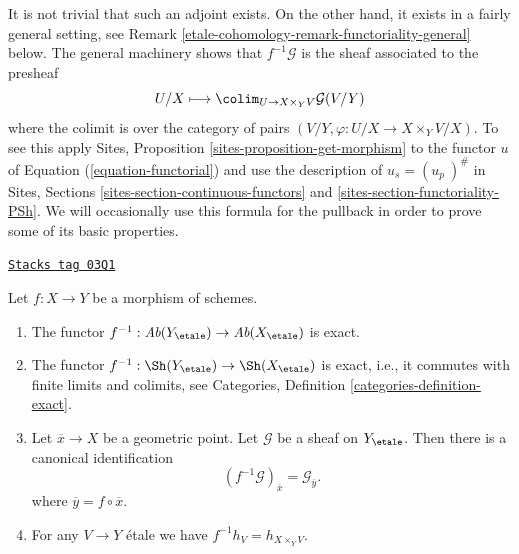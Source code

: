 It is not trivial that such an adjoint exists.
On the other hand, it exists in a fairly general setting, see
Remark \ref{etale-cohomology-remark-functoriality-general}
below. The general machinery shows that $f^{-1}\mathcal{G}$
is the sheaf associated to the presheaf
\begin{equation}
\label{equation-pullback}
U/X
\longmapsto
\colim_{U \to X \times_Y V} \mathcal{G}(V/Y)
\end{equation}
where the colimit is over the category of pairs
$(V/Y, \varphi : U/X \to X \times_Y V/X)$.
To see this apply
Sites, Proposition \ref{sites-proposition-get-morphism}
to the functor $u$ of Equation (\ref{equation-functorial})
and use the description of $u_s = (u_p\ )^\#$ in
Sites, Sections \ref{sites-section-continuous-functors} and
\ref{sites-section-functoriality-PSh}.
We will occasionally use this formula for the pullback
in order to prove some of its basic properties.

\begin{lemma}
\label{etale-cohomology-lemma-stalk-pullback}
\href{https://stacks.math.columbia.edu/tag/03Q1}{\texttt{Stacks tag 03Q1}}

Let $f : X \to Y$ be a morphism of schemes.
\begin{enumerate}
\item The functor
$f^{-1} : \textit{Ab}(Y_\etale) \to \textit{Ab}(X_\etale)$
is exact.
\item The functor
$f^{-1} : \Sh(Y_\etale) \to \Sh(X_\etale)$
is exact, i.e., it commutes with finite limits and colimits, see
Categories, Definition \ref{categories-definition-exact}.
\item Let $\overline{x} \to X$ be a geometric point.
Let $\mathcal{G}$ be a sheaf on $Y_\etale$.
Then there is a canonical identification
$$
(f^{-1}\mathcal{G})_{\overline{x}} = \mathcal{G}_{\overline{y}}.
$$
where $\overline{y} = f \circ \overline{x}$.
\item For any $V \to Y$ \'etale we have $f^{-1}h_V = h_{X \times_Y V}$.
\end{enumerate}
\end{lemma}

